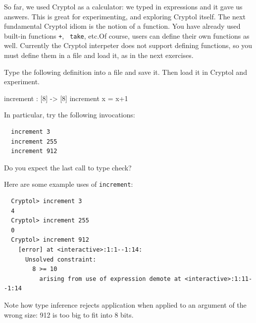 So far, we used Cryptol as a calculator: we typed in expressions and
it gave us answers. This is great for experimenting, and exploring
Cryptol itself.  The next fundamental Cryptol idiom is the notion of a
function. You have already used built-in functions {\tt +}, {\tt
  take}, etc.\indPlus\indLg Of course, users can define their own
functions as well.  Currently the Cryptol interpeter does not support
defining functions, so you must define them in a file and load it, as
in the next exercises.



\begin{Exercise}\label{ex:fn:0}
  Type the following definition into a file and save it. Then load it
  in Cryptol and experiment.
\begin{code}
  increment : [8] -> [8]
  increment x = x+1
\end{code}
In particular, try the following invocations:
\begin{Verbatim}
  increment 3
  increment 255
  increment 912
\end{Verbatim}
Do you expect the last call to type check?
\end{Exercise}
\begin{Answer}
Here are some example uses of {\tt increment}:
\begin{Verbatim}
  Cryptol> increment 3
  4
  Cryptol> increment 255
  0
  Cryptol> increment 912
    [error] at <interactive>:1:1--1:14:
      Unsolved constraint:
        8 >= 10
          arising from use of expression demote at <interactive>:1:11--1:14
\end{Verbatim}
Note how type inference rejects application when applied to an
argument of the wrong size: 912 is too big to fit into 8 bits.
\end{Answer}

\indFunApp

